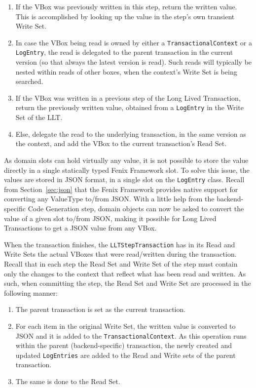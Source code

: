 \documentclass{llncs}
\begin{document}
\begin{enumerate}

\item If the VBox was previously written in this step, return the
  written value. This is accomplished by looking up the value in the
  step's own transient Write Set.

\item In case the VBox being read is owned by either a
  \texttt{TransactionalContext} or a \texttt{LogEntry}, the read is
  delegated to the parent transaction in the current version (so that
  always the latest version is read). Such reads will typically be
  nested within reads of other boxes, when the context's Write Set is
  being searched.

\item If the VBox was written in a previous step of the Long Lived
  Transaction, return the previously written value, obtained from a
  \texttt{LogEntry} in the Write Set of the LLT.

\item Else, delegate the read to the underlying transaction, in the
  same version as the context, and add the VBox to the current
  transaction's Read Set.

\end{enumerate}

As domain slots can hold virtually any value, it is not possible to
store the value directly in a single statically typed Fenix Framework
slot. To solve this issue, the values are stored in JSON format, in a
single slot on the \texttt{LogEntry} class. Recall from
Section~\ref{sec:json} that the Fenix Framework provides native
support for converting any ValueType to/from JSON. With a little help
from the backend-specific Code Generation step, domain objects can now
be asked to convert the value of a given slot to/from JSON, making it
possible for Long Lived Transactions to get a JSON value from any
VBox.

When the transaction finishes, the \texttt{LLTStepTransaction} has in
its Read and Write Sets the actual VBoxes that were read/written
during the transaction. Recall that in each step the Read Set and
Write Set of the step must contain only the changes to the context
that reflect what has been read and written. As such, when committing
the step, the Read Set and Write Set are processed in the following
manner:

\begin{enumerate}

\item The parent transaction is set as the current transaction.

\item For each item in the original Write Set, the written value is
  converted to JSON and it is added to the
  \texttt{TransactionalContext}. As this operation runs within the
  parent (backend-specific) transaction, the newly created and updated
  \texttt{LogEntries} are added to the Read and Write sets of the
  parent transaction.

\item The same is done to the Read Set.

\end{enumerate}
\end{document}
